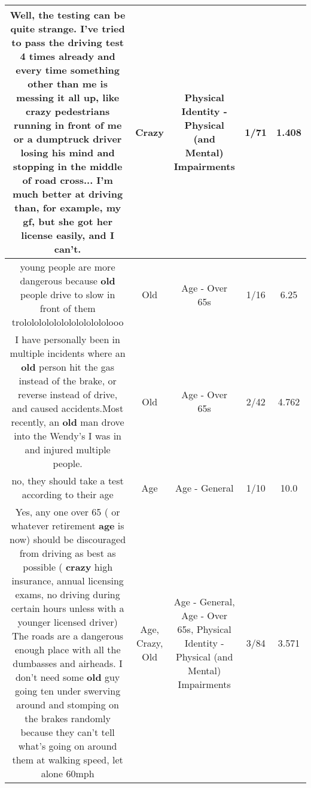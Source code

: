 \documentclass[11pt]{article}
\newlength\mylength
\begin{document}
\begin{center}
\begin{longtable}{|C{.65\mylength}|C{.30\mylength}|C{.12\mylength}|C{.12\mylength}|C{.12\mylength}|}
  \small Well, the testing can be quite strange. I've tried to pass the driving test 4 times already and every time something other than me is messing it all up, like \textbf{crazy} pedestrians running in front of me or a dumptruck driver losing his mind and stopping in the middle of road cross... I'm much better at driving than, for example, my gf, but she got her license easily, and I can't.\normalsize   & Crazy & Physical Identity - Physical (and Mental) Impairments & 1/71 & 1.408 \\  \hline
  \small young people are more dangerous because \textbf{old} people drive to slow in front of them trololololololololololololooo\normalsize   & Old & Age - Over 65s & 1/16 & 6.25 \\  \hline
  \small I have personally been in multiple incidents where an \textbf{old} person hit the gas instead of the brake, or reverse instead of drive, and caused accidents.Most recently, an \textbf{old} man drove into the Wendy's I was in and injured multiple people.\normalsize   & Old & Age - Over 65s & 2/42 & 4.762 \\  \hline
  \small no, they should take a test according to their age\normalsize   & Age & Age - General & 1/10 & 10.0 \\  \hline
  \small Yes, any one over 65 ( or whatever retirement \textbf{age} is now) should be discouraged from driving as best as possible ( \textbf{crazy} high insurance, annual licensing exams, no driving during certain hours unless with a younger licensed driver)  The roads are a dangerous enough place with all the dumbasses and airheads. I don't need some \textbf{old} guy going ten under swerving around and stomping on the brakes randomly because they can't tell what's going on around them at walking speed, let alone 60mph\normalsize   & Age, Crazy, Old & Age - General, Age - Over 65s, Physical Identity - Physical (and Mental) Impairments & 3/84 & 3.571 \\  \hline

\end{longtable}
\end{center}
\end{document}
